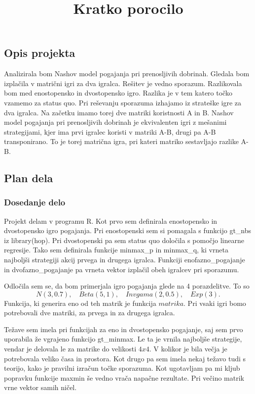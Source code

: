 \documentclass[
  12pt,
]{article}
\title{Kratko porocilo}
\author{}
\date{\vspace{-2.5em}}
\begin{document}
\maketitle

\hypertarget{opis-projekta}{%
\subsection{Opis projekta}\label{opis-projekta}}

Analizirala bom Nashov model pogajanja pri prenosljivih dobrinah.
Gledala bom izplačila v matrični igri za dva igralca. Rešitev je vedno
sporazum. Razlikovala bom med enostopensko in dvostopensko igro. Razlika
je v tem katero točko vzamemo za status quo. Pri reševanju sporazuma
izhajamo iz strateške igre za dva igralca. Na začetku imamo torej dve
matriki koristnosti A in B. Nashov model pogajanja pri prenosljivih
dobrinah je ekvivalenten igri z mešanimi strategijami, kjer ima prvi
igralec koristi v matriki A-B, drugi pa A-B transponirano. To je torej
matrična igra, pri kateri matriko sestavljajo razlike A-B.

\hypertarget{plan-dela}{%
\subsection{Plan dela}\label{plan-dela}}

\hypertarget{dosedanje-delo}{%
\subsubsection{Dosedanje delo}\label{dosedanje-delo}}

Projekt delam v programu R. Kot prvo sem definirala enostopensko in
dvostopensko igro pogajanja. Pri enostopenski sem si pomagala s funkcijo
gt\_nbs iz library(hop). Pri dvostopenski pa sem status quo določila s
pomočjo linearne regresije. Tako sem definirala funkcije minmax\_p in
minmax\_q, ki vrneta najboljši strategiji akcij prvega in drugega
igralca. Funkciji enofazno\_pogajanje in dvofazno\_pogajanje pa vrneta
vektor izplačil obeh igralcev pri sporazumu.

Odločila sem se, da bom primerjala igro pogajanja glede na 4
porazdelitve. To so
\[N(3, 0.7), \quad Beta(5,1), \quad Invgama(2, 0.5), \quad Exp(3).\]
Funkcija, ki generira eno od teh matrik je funkcija \(matrika.\) Pri
vsaki igri bomo potrebovali dve matriki, za prvega in za drugega
igralca.

Težave sem imela pri funkcijah za eno in dvostopensko pogajanje, saj sem
prvo uporabila že vgrajeno funkcijo gt\_minmax. Le ta je vrnila
najboljše strategije, vendar je delovala le za matrike do velikosti
\(4 x 4\). V kolikor je bila večja je potrebovala veliko časa in
prostora. Kot drugo pa sem imela nekaj težavo tudi s teorijo, kako je
pravilni izračun točke sporazuma. Kot ugotavljam pa mi kljub popravku
funkcije maxmin še vedno vrača napačne rezultate. Pri večino matrik vrne
vektor samih ničel.
\end{document}
